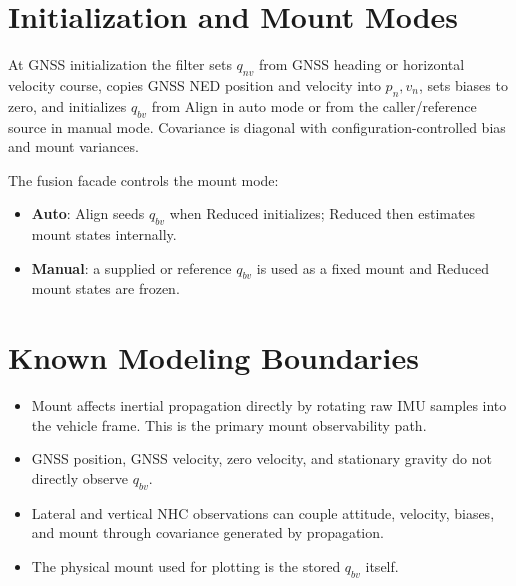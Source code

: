 \documentclass[11pt]{article}
\begin{document}
\section{Initialization and Mount Modes}

At GNSS initialization the filter sets \(q_{nv}\) from GNSS heading or horizontal
velocity course, copies GNSS NED position and velocity into \(p_n,v_n\), sets
biases to zero, and initializes \(q_{bv}\) from Align in auto mode or from the
caller/reference source in manual mode. Covariance is diagonal with
configuration-controlled bias and mount variances.

The fusion facade controls the mount mode:
\begin{itemize}[leftmargin=1.5em]
\item \textbf{Auto}: Align seeds \(q_{bv}\) when Reduced initializes; Reduced
then estimates mount states internally.
\item \textbf{Manual}: a supplied or reference \(q_{bv}\) is used as a fixed
mount and Reduced mount states are frozen.
\end{itemize}

\section{Known Modeling Boundaries}

\begin{itemize}[leftmargin=1.5em]
\item Mount affects inertial propagation directly by rotating raw IMU samples
into the vehicle frame. This is the primary mount observability path.
\item GNSS position, GNSS velocity, zero velocity, and stationary gravity do not
directly observe \(q_{bv}\).
\item Lateral and vertical NHC observations can couple attitude, velocity,
biases, and mount through covariance generated by propagation.
\item The physical mount used for plotting is the stored \(q_{bv}\) itself.
\end{itemize}
\end{document}
